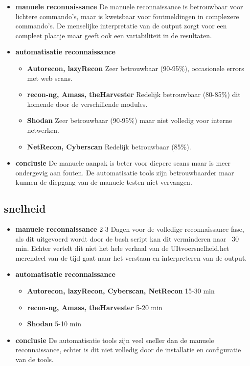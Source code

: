 \begin{itemize}
  \item \textbf{manuele reconnaissance} De manuele reconnaissance is betrouwbaar voor lichtere commando's, maar is kwetsbaar voor foutmeldingen in complexere commando's. De menselijke interpretatie van de output zorgt voor een compleet plaatje maar geeft ook een variabiliteit in de resultaten.
  \item \textbf{automatisatie reconnaissance} 
  \begin{itemize}
    \item \textbf{Autorecon, lazyRecon} Zeer betrouwbaar (90-95\%), occasionele errors met web scans.
    \item \textbf{recon-ng, Amass, theHarvester} Redelijk betrouwbaar (80-85\%) dit komende door de verschillende modules.
    \item \textbf{Shodan} Zeer betrouwbaar (90-95\%) maar niet volledig voor interne netwerken.
    \item \textbf{NetRecon, Cyberscan} Redelijk betrouwbaar (85\%).
  \end{itemize}
  \item \textbf{conclusie} De manuele aanpak is beter voor diepere scans maar is meer ondergevig aan fouten. De automatisatie tools zijn betrouwbaarder maar kunnen de diepgang van de manuele testen niet vervangen.
\end{itemize}

\subsection{snelheid}

\begin{itemize}
  \item \textbf{manuele reconnaissance} 2-3 Dagen voor de volledige reconnaissance fase, als dit uitgevoerd wordt door de bash script kan dit verminderen naar ~30 min. Echter vertelt dit niet het hele verhaal van de UItvoersnelheid,het merendeel van de tijd gaat naar het verstaan en interpreteren van de output.
  \item \textbf{automatisatie reconnaissance} 
  \begin{itemize}
    \item \textbf{Autorecon, lazyRecon, Cyberscan, NetRecon} 15-30 min
    \item \textbf{recon-ng, Amass, theHarvester} 5-20 min
    \item \textbf{Shodan} 5-10 min
  \end{itemize}
  \item \textbf{conclusie} De automatisatie tools zijn veel sneller dan de manuele reconnaissance, echter is dit niet volledig door de installatie en configuratie van de tools.
\end{itemize}


